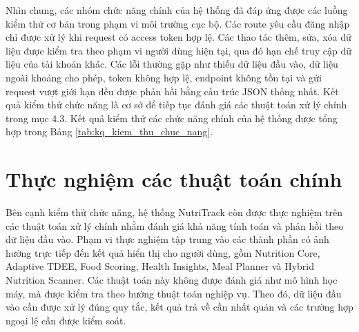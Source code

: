 \documentclass[12pt, a4paper]{report}
\begin{document}
Nhìn chung, các nhóm chức năng chính của hệ thống đã đáp ứng được các luồng kiểm thử cơ bản trong phạm vi môi trường cục bộ. Các route yêu cầu đăng nhập chỉ được xử lý khi request có access token hợp lệ. Các thao tác thêm, sửa, xóa dữ liệu được kiểm tra theo phạm vi người dùng hiện tại, qua đó hạn chế truy cập dữ liệu của tài khoản khác. Các lỗi thường gặp như thiếu dữ liệu đầu vào, dữ liệu ngoài khoảng cho phép, token không hợp lệ, endpoint không tồn tại và gửi request vượt giới hạn đều được phản hồi bằng cấu trúc JSON thống nhất. Kết quả kiểm thử chức năng là cơ sở để tiếp tục đánh giá các thuật toán xử lý chính trong mục 4.3. Kết quả kiểm thử các chức năng chính của hệ thống được tổng hợp trong Bảng \ref{tab:kq_kiem_thu_chuc_nang}.

\section{Thực nghiệm các thuật toán chính}Bên cạnh kiểm thử chức năng, hệ thống NutriTrack còn được thực nghiệm trên các thuật toán xử lý chính nhằm đánh giá khả năng tính toán và phản hồi theo dữ liệu đầu vào. Phạm vi thực nghiệm tập trung vào các thành phần có ảnh hưởng trực tiếp đến kết quả hiển thị cho người dùng, gồm Nutrition Core, Adaptive TDEE, Food Scoring, Health Insights, Meal Planner và Hybrid Nutrition Scanner. Các thuật toán này không được đánh giá như mô hình học máy, mà được kiểm tra theo hướng thuật toán nghiệp vụ. Theo đó, dữ liệu đầu vào cần được xử lý đúng quy tắc, kết quả trả về cần nhất quán và các trường hợp ngoại lệ cần được kiểm soát.
\end{document}

